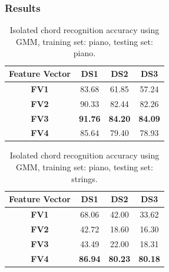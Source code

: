 \documentclass{beamer}
\begin{document}
\begin{frame}
	\frametitle{Results}
	
\begin{table}\small
\centering
\begin{tabular}{|c|c|c|c|} \hline
\textbf{Feature Vector} & \textbf{DS1} & \textbf{DS2} & \textbf{DS3} \\ \hline
\textbf{FV1} & 83.68 & 61.85 & 57.24 \\ \hline
\textbf{FV2} & 90.33 & 82.44 & 82.26 \\ \hline
\textbf{FV3} & \textbf{91.76} & \textbf{84.20} & \textbf{84.09} \\ \hline
\textbf{FV4} & 85.64 & 79.40 & 78.93 \\ \hline
\end{tabular}
\caption{Isolated chord recognition accuracy using GMM, training set: piano, testing set: piano.}
\label{tab:tab3}
\end{table} 

\begin{table}\small
\centering
\begin{tabular}{|c|c|c|c|} \hline
\textbf{Feature Vector} & \textbf{DS1} & \textbf{DS2} & \textbf{DS3} \\ \hline
\textbf{FV1} & 68.06 & 42.00 & 33.62 \\ \hline
\textbf{FV2} & 42.72 & 18.60 & 16.30 \\ \hline
\textbf{FV3} & 43.49 & 22.00 & 18.31 \\ \hline
\textbf{FV4} & \textbf{86.94} & \textbf{80.23} & \textbf{80.18} \\ \hline
\end{tabular}
\caption{Isolated chord recognition accuracy using GMM, training set: piano, testing set: strings.}
\label{tab:tab4}
\end{table}



\end{frame}
\end{document}

